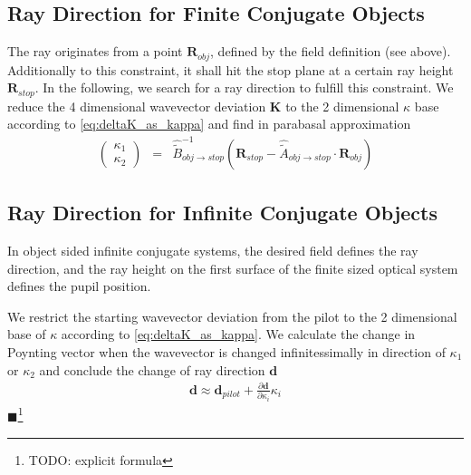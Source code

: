 \documentclass[12pt,a4paper,twoside,openright,BCOR10mm,headsepline,titlepage,abstracton,chapterprefix,final]{scrreprt}
\newcommand\Vector[1]{{\mathbf{#1}}}
\newcommand{\remark}[1]{{\color{red}$\blacksquare$}\footnote{{\color{red}#1}}}
\begin{document}
\subsection{Ray Direction for Finite Conjugate Objects}
The ray originates from a point $\Vector{R}_{obj}$, defined by the field definition (see above).
Additionally to this constraint, it shall hit the stop plane at a certain ray height $\Vector{R}_{stop}$.
In the following, we search for a ray direction to fulfill this constraint.
We reduce the 4 dimensional wavevector deviation $\Vector{K}$ to the 2 dimensional $\kappa$ base according to \eqref{eq:deltaK_as_kappa}
and find in parabasal approximation
\begin{eqnarray}
 \begin{pmatrix}\kappa_1 \\ \kappa_2\end{pmatrix}
 &=&
 \hat{\tilde{B}}_{obj\rightarrow stop}^{-1}
 \left(
    \Vector{R}_{stop} - \hat{\tilde{A}}_{obj\rightarrow stop} \cdot \Vector{R}_{obj} 
 \right) 
\end{eqnarray}


\subsection{Ray Direction for Infinite Conjugate Objects}
In object sided infinite conjugate systems, the desired field defines the ray direction, 
and the ray height on the first surface of the finite sized optical system defines the pupil position.

We restrict the starting wavevector deviation from the pilot to the 2 dimensional base of $\kappa$ according to \eqref{eq:deltaK_as_kappa}.
We calculate the change in Poynting vector when the wavevector is changed infinitessimally in direction of $\kappa_1$ or $\kappa_2$
and conclude the change of ray direction $\Vector{d}$
\begin{eqnarray}
 \Vector{d} \approx \Vector{d}_{pilot} + \frac{\partial \Vector{d}}{\partial \kappa_i} \kappa_i
\end{eqnarray}
\remark{TODO: explicit formula}
\end{document}
